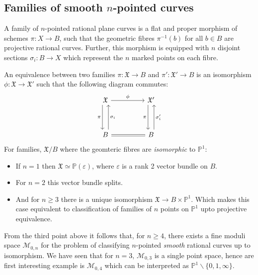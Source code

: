 \subsection{Families of smooth $n$-pointed curves}
\begin{definition}
    A family of $n$-pointed rational plane curves is a flat and proper morphism of schemes $\pi: X \to B$, such that the geometric fibres $\pi^{-1}(b)$ for all $b \in B$ are projective rational curves.
    Further, this morphism is equipped with $n$ disjoint sections $\sigma_{i}:B \to X$ which represent the $n$ marked points on each fibre.
\end{definition}
An equivalence between two families $\pi: \mathfrak{X} \to B$ and $\pi': \mathfrak{X}' \to B$ is an isomorphism $\phi: \mathfrak{X} \to \mathfrak{X}'$ such that the following diagram commutes:
\[
    \begin{tikzcd}
        \mathfrak{X} & & \mathfrak{X}'\\
                                & & \\
        B & & B
        \arrow[swap, "\pi",xshift = -1ex, from = 1-1, to = 3-1]
        \arrow[ swap, "\sigma_{i}", xshift = 1ex,from = 3-1, to = 1-1]
        \arrow[swap, "\pi",xshift = -1ex, from = 1-3, to = 3-3]
        \arrow[ swap, "\sigma_{i}'", xshift = 1ex,from = 3-3, to = 1-3]
        \arrow["\phi", from = 1-1, to = 1-3]
        \arrow[equal,  from = 3-1, to= 3-3]
    \end{tikzcd}
\]
For families, $\mathfrak{X}/B$ where the geomteric fibres are \textit{isomorphic} to $\mathbb{P}^{1}$:
\begin{itemize}
    \item If $n=1$ then $\mathfrak{X} \simeq \mathbb{P}(\varepsilon)$, where $\varepsilon$ is a rank 2 vector bundle on $B$.
    \item For $n=2$ this vector bundle splits.
    \item And for $n\geq 3$ there is a unique isomorphism $\mathfrak{X}\to B \times \mathbb{P}^{1}$. 
        Which makes this case equivalent to classification of families of $n$ points on $\mathbb{P}^{1}$ upto projective equivalence.
\end{itemize}
From the third point above it follows that, for $n\geq 4$, there exists a fine moduli space $\mathcal{M}_{0,n}$ for the problem of classifying $n$-pointed \textit{smooth} rational curves up to isomorphism.
We have seen that for $n=3$, $\mathcal{M}_{0,3}$ is a single point space, hence are first interesting example is $\mathcal{M}_{0,4}$ which can be interpreted as $\mathbb{P}^{1}\backslash\{0,1,\infty\}$.

